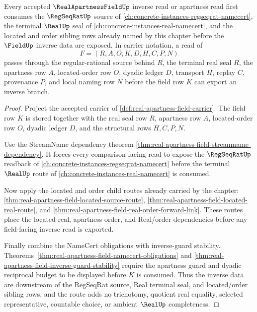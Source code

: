 \begin{theorem}
\label{thm:real-apartness-field-regular-cauchy-source-route}
Every accepted $\RealApartnessFieldUp$ inverse read or apartness read first consumes the $\RegSeqRatUp$ source of \autoref{ch:concrete-instances-regseqrat-namecert}, the terminal $\RealUp$ seal of \autoref{ch:concrete-instances-real-namecert}, and the located and order sibling rows already named by this chapter before the $\FieldUp$ inverse data are exposed. In carrier notation, a read of
$$
F=(R,A,O,K,D,H,C,P,N)
$$
passes through the regular-rational source behind $R$, the terminal real seal $R$, the apartness row $A$, located-order row $O$, dyadic ledger $D$, transport $H$, replay $C$, provenance $P$, and local naming row $N$ before the field row $K$ can export an inverse branch.
\end{theorem}
\begin{proof}
Project the accepted carrier of \autoref{def:real-apartness-field-carrier}. The field row $K$ is stored together with the real seal row $R$, apartness row $A$, located-order row $O$, dyadic ledger $D$, and the structural rows $H,C,P,N$.

Use the StreamName dependency theorem \autoref{thm:real-apartness-field-streamname-dependency}. It forces every comparison-facing read to expose the $\RegSeqRatUp$ readback of \autoref{ch:concrete-instances-regseqrat-namecert} before the terminal $\RealUp$ route of \autoref{ch:concrete-instances-real-namecert} is consumed.

Now apply the located and order child routes already carried by the chapter: \autoref{thm:real-apartness-field-located-source-route}, \autoref{thm:real-apartness-field-located-real-route}, and \autoref{thm:real-apartness-field-real-order-forward-link}. These routes place the located-real, apartness-order, and Real/order dependencies before any field-facing inverse read is exported.

Finally combine the NameCert obligations with inverse-guard stability. Theorems~\ref{thm:real-apartness-field-namecert-obligations} and \ref{thm:real-apartness-field-inverse-guard-stability} require the apartness guard and dyadic reciprocal budget to be displayed before $K$ is consumed. Thus the inverse data are downstream of the RegSeqRat source, Real terminal seal, and located/order sibling rows, and the route adds no trichotomy, quotient real equality, selected representative, countable choice, or ambient $\RealUp$ completeness.
\end{proof}
